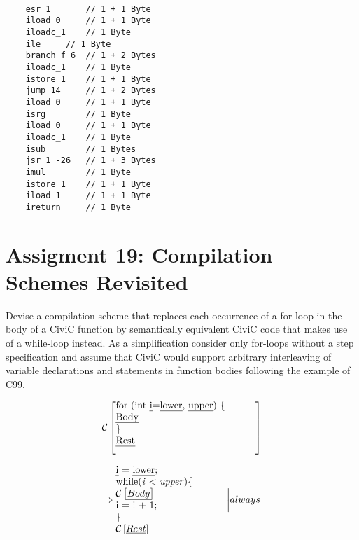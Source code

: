 \documentclass[12pt]{article}
\begin{document}
\begin{enumerate}[a)]
\begin{lstlisting}

	esr 1		// 1 + 1 Byte
	iload 0		// 1 + 1 Byte
	iloadc_1	// 1 Byte
	ile		// 1 Byte
	branch_f 6	// 1 + 2 Bytes
	iloadc_1	// 1 Byte
	istore 1	// 1 + 1 Byte
	jump 14		// 1 + 2 Bytes	
	iload 0		// 1 + 1 Byte
	isrg		// 1 Byte
	iload 0		// 1 + 1 Byte
	iloadc_1	// 1 Byte
	isub		// 1 Bytes
	jsr 1 -26 	// 1 + 3 Bytes
	imul		// 1 Byte
	istore 1	// 1 + 1 Byte
	iload 1		// 1 + 1 Byte
	ireturn		// 1 Byte
\end{lstlisting}

\section*{Assigment 19: Compilation Schemes Revisited}

Devise a compilation scheme that replaces each occurrence of a for-loop in the body of a CiviC function by semantically equivalent CiviC code that makes use of a while-loop instead. As a simplification consider only for-loops without a step specification and assume that CiviC would support arbitrary interleaving of variable declarations and statements in function bodies following the example of C99.


\begin{equation}
\mathcal{C} \left[
\parbox{5cm}{
for (int \emph{i}=\emph{lower}, \emph{upper}) \{\\
	\emph{Body}\\
\}\\
\emph{Rest}\\
}
\right]
\end{equation}

\begin{equation}
\Rightarrow \parbox{4cm}{
\emph{i} = \emph{lower};\\
while(\textit{i} $<$ \textit{upper})\{\\
	$\mathcal{C} \left[ \emph{Body}  \right]$\\
	i = i + 1;\\
\}\\
$\mathcal{C} \left[ \emph{Rest} \right]$
}
\bigg| always
\end{equation}

\end{enumerate}
\end{document}
